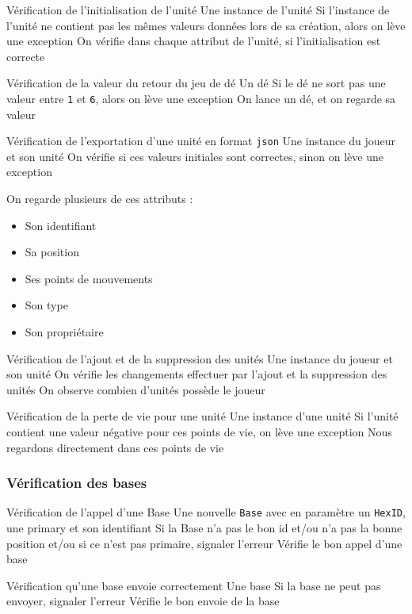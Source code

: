 \mytest
{Vérification de l'initialisation de l'unité}
{Une instance de l'unité}
{Si l'instance de l'unité ne contient pas les mêmes valeurs données lors de sa création, alors on lève une exception}
{On vérifie dans chaque attribut de l'unité, si l'initialisation est correcte}

\mytest
{Vérification de la valeur du retour du jeu de dé}
{Un dé}
{Si le dé ne sort pas une valeur entre \texttt{1} et \texttt{6}, alors on lève une exception}
{On lance un dé, et on regarde sa valeur}

\mytest
{Vérification de l'exportation d'une unité en format \texttt{json}}
{Une instance du joueur et son unité}
{On vérifie si ces valeurs initiales sont correctes, sinon on lève une exception}
{
    On regarde plusieurs de ces attributs :
    \begin{itemize}
        \item Son identifiant
        \item Sa position
        \item Ses points de mouvements
        \item Son type
        \item Son propriétaire
    \end{itemize}
}

\mytest
{Vérification de l'ajout et de la suppression des unités}
{Une instance du joueur et son unité}
{On vérifie les changements effectuer par l'ajout et la suppression des unités}
{On observe combien d'unités possède le joueur}

\mytest
{Vérification de la perte de vie pour une unité}
{Une instance d'une unité}
{Si l'unité contient une valeur négative pour ces points de vie, on lève une exception}
{Nous regardons directement dans ces points de vie}

\subsubsection{Vérification des bases}

\mytest
{Vérification de l'appel d'une Base}
{Une nouvelle {\tt Base} avec en paramètre un {\tt HexID}, une primary et son identifiant }
{Si la Base n'a pas le bon id et/ou n'a pas la bonne position et/ou si ce n'est pas primaire, signaler l'erreur }
{Vérifie le bon appel d'une base}

\mytest
{Vérification qu'une base envoie correctement}
{Une base}
{Si la base ne peut pas envoyer,  signaler l'erreur }
{Vérifie le bon envoie de la base }

